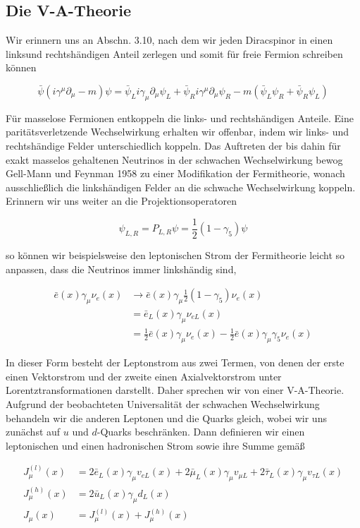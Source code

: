 \documentclass[10pt, letterpaper]{article}
\begin{document}
\subsection*{Die V-A-Theorie}
Wir erinnern uns an Abschn. 3.10, nach dem wir jeden Diracspinor in einen linksund rechtshändigen Anteil zerlegen und somit für freie Fermion schreiben können

$$
\bar{\psi}\left(i \gamma^{\mu} \partial_{\mu}-m\right) \psi=\bar{\psi}_{L} i \gamma_{\mu} \partial_{\mu} \psi_{L}+\bar{\psi}_{R} i \gamma^{\mu} \partial_{\mu} \psi_{R}-m\left(\bar{\psi}_{L} \psi_{R}+\bar{\psi}_{R} \psi_{L}\right)
$$

Für masselose Fermionen entkoppeln die links- und rechtshändigen Anteile. Eine paritätsverletzende Wechselwirkung erhalten wir offenbar, indem wir links- und rechtshändige Felder unterschiedlich koppeln. Das Auftreten der bis dahin für exakt masselos gehaltenen Neutrinos in der schwachen Wechselwirkung bewog Gell-Mann und Feynman 1958 zu einer Modifikation der Fermitheorie, wonach ausschließlich die linkshändigen Felder an die schwache Wechselwirkung koppeln. Erinnern wir uns weiter an die Projektionsoperatoren

$$
\psi_{L, R}=P_{L, R} \psi=\frac{1}{2}\left(1-\gamma_{5}\right) \psi
$$

so können wir beispielsweise den leptonischen Strom der Fermitheorie leicht so anpassen, dass die Neutrinos immer linkshändig sind,

$$
\begin{aligned}
\bar{e}(x) \gamma_{\mu} \nu_{e}(x) & \rightarrow \bar{e}(x) \gamma_{\mu} \frac{1}{2}\left(1-\gamma_{5}\right) \nu_{e}(x) \\
& =\bar{e}_{L}(x) \gamma_{\mu} \nu_{e L}(x) \\
& =\frac{1}{2} \bar{e}(x) \gamma_{\mu} \nu_{e}(x)-\frac{1}{2} \bar{e}(x) \gamma_{\mu} \gamma_{5} \nu_{e}(x)
\end{aligned}
$$

In dieser Form besteht der Leptonstrom aus zwei Termen, von denen der erste einen Vektorstrom und der zweite einen Axialvektorstrom unter Lorentztransformationen darstellt. Daher sprechen wir von einer V-A-Theorie. Aufgrund der beobachteten Universalität der schwachen Wechselwirkung behandeln wir die anderen Leptonen und die Quarks gleich, wobei wir uns zunächst auf $u$ und $d$-Quarks beschränken. Dann definieren wir einen leptonischen und einen hadronischen Strom sowie ihre Summe gemäß

$$
\begin{aligned}
J_{\mu}^{(l)}(x) & =2 \bar{e}_{L}(x) \gamma_{\mu} v_{e L}(x)+2 \bar{\mu}_{L}(x) \gamma_{\mu} v_{\mu L}+2 \bar{\tau}_{L}(x) \gamma_{\mu} v_{\tau L}(x) \\
J_{\mu}^{(h)}(x) & =2 \bar{u}_{L}(x) \gamma_{\mu} d_{L}(x) \\
J_{\mu}(x) & =J_{\mu}^{(l)}(x)+J_{\mu}^{(h)}(x)
\end{aligned}
$$
\end{document}
